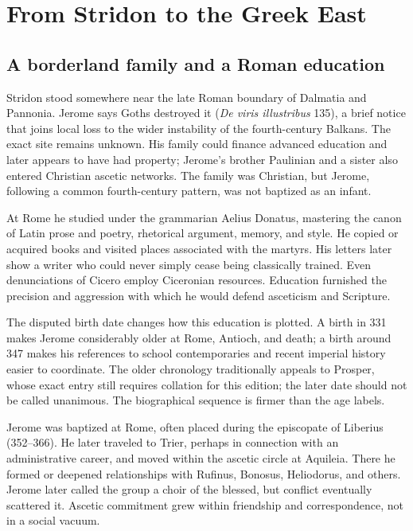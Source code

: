 \section{From Stridon to the Greek East}\label{sec:jerome-youth}

\subsection{A borderland family and a Roman education}

Stridon stood somewhere near the late Roman boundary of Dalmatia and Pannonia.
Jerome says Goths destroyed it (\emph{De viris illustribus} 135), a brief
notice that joins local loss to the wider instability of the fourth-century
Balkans. The exact site remains unknown. His family could finance advanced
education and later appears to have had property; Jerome's brother Paulinian
and a sister also entered Christian ascetic networks. The family was Christian,
but Jerome, following a common fourth-century pattern, was not baptized as an
infant.

At Rome he studied under the grammarian Aelius Donatus, mastering the canon of
Latin prose and poetry, rhetorical argument, memory, and style. He copied or
acquired books and visited places associated with the martyrs. His letters
later show a writer who could never simply cease being classically trained.
Even denunciations of Cicero employ Ciceronian resources. Education furnished
the precision and aggression with which he would defend asceticism and
Scripture.

The disputed birth date changes how this education is plotted. A birth in 331
makes Jerome considerably older at Rome, Antioch, and death; a birth around
347 makes his references to school contemporaries and recent imperial history
easier to coordinate. The older chronology traditionally appeals to Prosper,
whose exact entry still requires collation for this edition; the later date
should not be called unanimous. The biographical sequence is firmer than the
age labels.

Jerome was baptized at Rome, often placed during the episcopate of Liberius
(352--366). He later traveled to Trier, perhaps in connection with an
administrative career, and moved within the ascetic circle at Aquileia. There
he formed or deepened relationships with Rufinus, Bonosus, Heliodorus, and
others. Jerome later called the group a choir of the blessed, but conflict
eventually scattered it. Ascetic commitment grew within friendship and
correspondence, not in a social vacuum.

